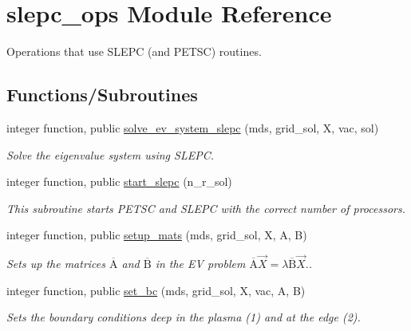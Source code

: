 \hypertarget{namespaceslepc__ops}{}\section{slepc\+\_\+ops Module Reference}
\label{namespaceslepc__ops}


Operations that use S\+L\+E\+PC (and P\+E\+T\+SC) routines.  


\subsection*{Functions/\+Subroutines}
\begin{DoxyCompactItemize}
\item 
integer function, public \hyperlink{namespaceslepc__ops_a79c420987056c225931b51c8d30ece1f}{solve\+\_\+ev\+\_\+system\+\_\+slepc} (mds, grid\+\_\+sol, X, vac, sol)
\begin{DoxyCompactList}\small\item\em Solve the eigenvalue system using S\+L\+E\+PC. \end{DoxyCompactList}\item 
integer function, public \hyperlink{namespaceslepc__ops_a9cec5d9e8abc41d0d7ffb14352112040}{start\+\_\+slepc} (n\+\_\+r\+\_\+sol)
\begin{DoxyCompactList}\small\item\em This subroutine starts P\+E\+T\+SC and S\+L\+E\+PC with the correct number of processors. \end{DoxyCompactList}\item 
integer function, public \hyperlink{namespaceslepc__ops_aac8202cb74cbb06013eb73f1fa0c3118}{setup\+\_\+mats} (mds, grid\+\_\+sol, X, A, B)
\begin{DoxyCompactList}\small\item\em Sets up the matrices $\overline{\text{A}}$ and $\overline{\text{B}}$ in the EV problem $ \overline{\text{A}} \vec{X} = \lambda \overline{\text{B}} \vec{X}. $. \end{DoxyCompactList}\item 
integer function, public \hyperlink{namespaceslepc__ops_a05f8a23335ed47ad1996cddf3bcfdc2e}{set\+\_\+bc} (mds, grid\+\_\+sol, X, vac, A, B)
\begin{DoxyCompactList}\small\item\em Sets the boundary conditions deep in the plasma (1) and at the edge (2). \end{DoxyCompactList}\item 

\end{DoxyCompactItemize}
